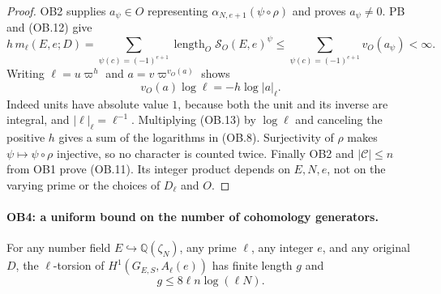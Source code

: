 \begin{proof}
OB2 supplies $a_\psi\in O$ representing
$\alpha_{N,e+1}(\psi\circ\rho)$ and proves $a_\psi\ne0$.
PB and (OB.12) give
\[
 h\,m_\ell(E,e;D)
  =\sum_{\psi(c)=(-1)^{e+1}}
                  \operatorname{length}_O\mathcal S_O(E,e)^\psi
  \le\sum_{\psi(c)=(-1)^{e+1}}v_O(a_\psi)<\infty.
 \tag{OB.13}
\]
Writing $\ell=u\varpi^h$ and $a=v\varpi^{v_O(a)}$ shows
\[
            v_O(a)\log\ell=-h\log|a|_\ell.
\]
Indeed units have absolute value $1$, because both the unit and
its inverse are integral, and $|\ell|_\ell=\ell^{-1}$.
Multiplying (OB.13) by $\log\ell$ and canceling the positive $h$
gives a sum of the logarithms in (OB.8).  Surjectivity of $\rho$
makes $\psi\mapsto\psi\circ\rho$ injective, so no character is
counted twice.  Finally OB2 and $|\mathcal C|\le n$ from OB1
prove (OB.11).  Its integer product depends on $E,N,e$, not on
the varying prime or the choices of $D_\ell$ and $O$.
\end{proof}

\paragraph{OB4: a uniform bound on the number of cohomology generators.}
\label{claim:OB4}
For any number field $E\hookrightarrow\mathbb Q(\zeta_N)$,
any prime $\ell$, any integer $e$, and any original $D$, the
$\ell$-torsion of $H^1(G_{E,S},A_\ell(e))$ has finite length $g$ and
\[
                    g\le8\ell n\log(\ell N).
 \tag{OB.14}
\]

